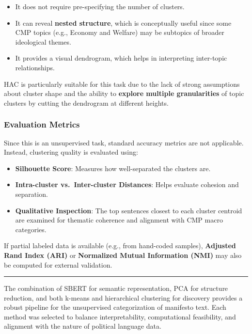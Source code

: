\documentclass[
  letterpaper,
  DIV=11,
  numbers=noendperiod]{scrartcl}
\providecommand{\tightlist}{%
  \setlength{\itemsep}{0pt}\setlength{\parskip}{0pt}}
\begin{document}
\begin{itemize}
\tightlist
\item
  It does not require pre-specifying the number of clusters.
\item
  It can reveal \textbf{nested structure}, which is conceptually useful
  since some CMP topics (e.g., Economy and Welfare) may be subtopics of
  broader ideological themes.
\item
  It provides a visual dendrogram, which helps in interpreting
  inter-topic relationships.
\end{itemize}

HAC is particularly suitable for this task due to the lack of strong
assumptions about cluster shape and the ability to \textbf{explore
multiple granularities} of topic clusters by cutting the dendrogram at
different heights.

\subsubsection{Evaluation Metrics}\label{evaluation-metrics}

Since this is an unsupervised task, standard accuracy metrics are not
applicable. Instead, clustering quality is evaluated using:

\begin{itemize}
\tightlist
\item
  \textbf{Silhouette Score}: Measures how well-separated the clusters
  are.
\item
  \textbf{Intra-cluster vs.~Inter-cluster Distances}: Helps evaluate
  cohesion and separation.
\item
  \textbf{Qualitative Inspection}: The top sentences closest to each
  cluster centroid are examined for thematic coherence and alignment
  with CMP macro categories.
\end{itemize}

If partial labeled data is available (e.g., from hand-coded samples),
\textbf{Adjusted Rand Index (ARI)} or \textbf{Normalized Mutual
Information (NMI)} may also be computed for external validation.

\begin{center}\rule{0.5\linewidth}{0.5pt}\end{center}

The combination of SBERT for semantic representation, PCA for structure
reduction, and both k-means and hierarchical clustering for discovery
provides a robust pipeline for the unsupervised categorization of
manifesto text. Each method was selected to balance interpretability,
computational feasibility, and alignment with the nature of political
language data.
\end{document}

